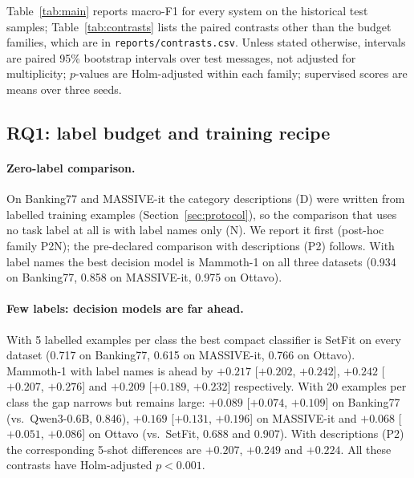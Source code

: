 
Table~\ref{tab:main} reports macro-F1 for every system on the historical test samples; Table~\ref{tab:contrasts} lists the
paired contrasts other than the budget families, which are in \texttt{reports/contrasts.csv}. Unless stated otherwise, intervals are
paired 95\% bootstrap intervals over test messages, not adjusted for multiplicity; $p$-values are Holm-adjusted within each family;
supervised scores are means over three seeds.

\subsection{RQ1: label budget and training recipe}

\paragraph{Zero-label comparison.} On Banking77 and MASSIVE-it the category descriptions (D) were written from labelled training
examples (Section~\ref{sec:protocol}), so the comparison that uses no task label at all is with label names only (N). We report it first
(post-hoc family P2N); the pre-declared comparison with descriptions (P2) follows. With label names the best decision model is Mammoth-1
on all three datasets (0.934 on Banking77, 0.858 on MASSIVE-it, 0.975 on Ottavo).

\paragraph{Few labels: decision models are far ahead.} With 5 labelled examples per class the best compact classifier is SetFit on
every dataset (0.717 on Banking77, 0.615 on MASSIVE-it, 0.766 on Ottavo). Mammoth-1 with label names is ahead by $+0.217$ [$+0.202$,
$+0.242$], $+0.242$ [$+0.207$, $+0.276$] and $+0.209$ [$+0.189$, $+0.232$] respectively. With 20 examples per class the gap narrows but
remains large: $+0.089$ [$+0.074$, $+0.109$] on Banking77 (vs.\ Qwen3-0.6B, 0.846), $+0.169$ [$+0.131$, $+0.196$] on MASSIVE-it and
$+0.068$ [$+0.051$, $+0.086$] on Ottavo (vs.\ SetFit, 0.688 and 0.907). With descriptions (P2) the corresponding 5-shot differences are
$+0.207$, $+0.249$ and $+0.224$. All these contrasts have Holm-adjusted $p<0.001$.


